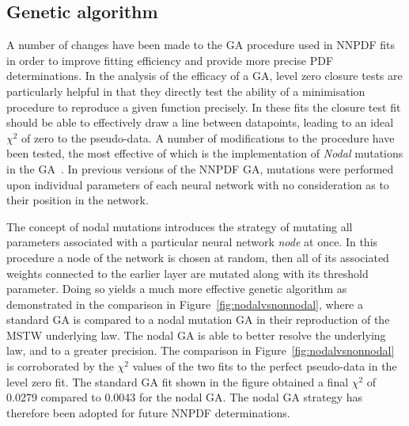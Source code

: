 \subsection{Genetic algorithm}
A number of changes have been made to the GA procedure used in NNPDF fits in order to improve fitting efficiency and provide more precise PDF determinations. In the analysis of the efficacy of a GA, level zero closure tests are particularly helpful in that they
directly test the ability of a minimisation procedure to reproduce a given function precisely. In these fits the closure test fit should be able to effectively draw a line between datapoints, leading to an ideal $\chi^2$ of zero to the pseudo-data.
%
%
%
%
A number of modifications to the procedure have been tested, the most effective of which is the implementation of \emph{Nodal} mutations in the GA~\cite{Montana:1989:TFN:1623755.1623876}. In previous versions of the NNPDF GA, mutations were performed upon individual parameters of each neural network with no consideration as to their position in the network. 

The concept of nodal mutations introduces the strategy of mutating all parameters associated with a particular neural network \emph{node} at once. In this procedure a node of the network is chosen at random, then all of its associated weights connected to the earlier layer are mutated along with its threshold parameter. Doing so yields a much more effective genetic algorithm as demonstrated in the comparison in Figure~\ref{fig:nodalvsnonnodal}, where a standard GA is compared to a nodal mutation GA in their reproduction of the MSTW underlying law. The nodal GA is able to better resolve the underlying law, and to a greater precision. The comparison in Figure~\ref{fig:nodalvsnonnodal} is corroborated by the $\chi^2$ values of the two fits to the perfect pseudo-data in the level zero fit. The standard GA fit shown in the figure obtained a final $\chi^2$ of 0.0279 compared to 0.0043 for the nodal GA. The nodal GA strategy has therefore been adopted for future NNPDF determinations.

